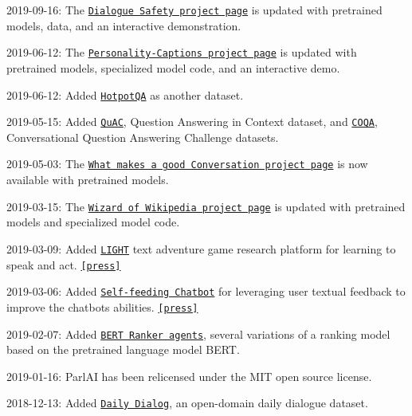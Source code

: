 2019-\/09-\/16\+: The \href{https://parl.ai/projects/dialogue_safety/}{\tt Dialogue Safety project page} is updated with pretrained models, data, and an interactive demonstration.

2019-\/06-\/12\+: The \href{http://parl.ai/projects/personality_captions/}{\tt Personality-\/\+Captions project page} is updated with pretrained models, specialized model code, and an interactive demo.

2019-\/06-\/12\+: Added \href{https://github.com/facebookresearch/ParlAI/tree/master/parlai/tasks/quac}{\tt Hotpot\+QA} as another dataset.

2019-\/05-\/15\+: Added \href{https://github.com/facebookresearch/ParlAI/tree/master/parlai/tasks/quac}{\tt Qu\+AC}, Question Answering in Context dataset, and \href{https://github.com/facebookresearch/ParlAI/tree/master/parlai/tasks/coqa}{\tt C\+O\+QA}, Conversational Question Answering Challenge datasets.

2019-\/05-\/03\+: The \href{https://parl.ai/projects/controllable_dialogue/}{\tt What makes a good Conversation project page} is now available with pretrained models.

2019-\/03-\/15\+: The \href{http://parl.ai/projects/wizard_of_wikipedia/}{\tt Wizard of Wikipedia project page} is updated with pretrained models and specialized model code.

2019-\/03-\/09\+: Added \href{http://parl.ai/projects/light}{\tt L\+I\+G\+HT} text adventure game research platform for learning to speak and act. \href{https://venturebeat.com/2019/03/08/facebook-ai-researchers-create-a-text-based-adventure-to-study-how-ai-speak-and-act/}{\tt \mbox{[}press\mbox{]}}

2019-\/03-\/06\+: Added \href{http://parl.ai/projects/self_feeding}{\tt Self-\/feeding Chatbot} for leveraging user textual feedback to improve the chatbot\textquotesingle{}s abilities. \href{https://venturebeat.com/2019/01/17/facebook-and-stanford-researchers-design-a-chatbot-that-learns-from-its-mistakes/}{\tt \mbox{[}press\mbox{]}}

2019-\/02-\/07\+: Added \href{https://github.com/facebookresearch/ParlAI/tree/master/parlai/agents/bert_ranker}{\tt B\+E\+RT Ranker agents}, several variations of a ranking model based on the pretrained language model B\+E\+RT.

2019-\/01-\/16\+: Parl\+AI has been relicensed under the M\+IT open source license.

2018-\/12-\/13\+: Added \href{https://github.com/facebookresearch/ParlAI/blob/master/parlai/tasks/dailydialog/agents.py}{\tt Daily Dialog}, an open-\/domain daily dialogue dataset.

